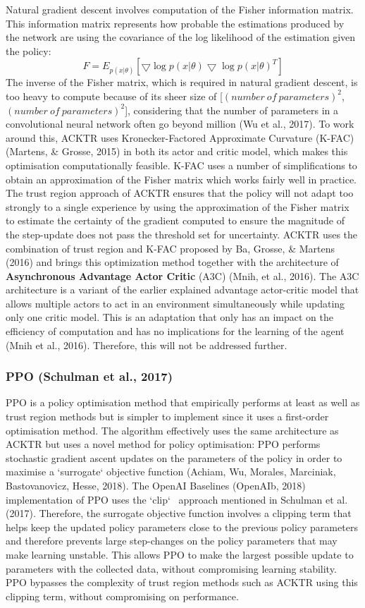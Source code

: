 Natural gradient descent involves computation of the Fisher information matrix. This information matrix represents how probable the estimations produced by the network are using the covariance of the log likelihood of the estimation given the policy: 
\[ F = E_{p(x|\theta)}[\bigtriangledown \log p(x|\theta) \bigtriangledown \log p(x|\theta)^{T}] \]
The inverse of the Fisher matrix, which is required in natural gradient descent, is too heavy to compute because of its sheer size of [$(number \ of \ parameters)^{2}$, $(number \ of \ parameters)^{2}$], considering that the number of parameters in a convolutional neural network often go beyond million (Wu et al., 2017). To work around this, ACKTR uses Kronecker-Factored Approximate Curvature (K-FAC) (Martens, \& Grosse, 2015) in both its actor and critic model, which makes this optimisation computationally feasible. K-FAC uses a number of simplifications to obtain an approximation of the Fisher matrix which works fairly well in practice. The trust region approach of ACKTR ensures that the policy will not adapt too strongly to a single experience by using the approximation of the Fisher matrix to estimate the certainty of the gradient computed to ensure the magnitude of the step-update does not pass the threshold set for uncertainty. ACKTR uses the combination of trust region and K-FAC proposed by Ba, Grosse, \& Martens (2016) and brings this optimization method together with the architecture of \textbf{Asynchronous Advantage Actor Critic} (A3C) (Mnih, et al., 2016). The A3C architecture is a variant of the earlier explained advantage actor-critic model that allows multiple actors to act in an environment simultaneously while updating only one critic model. This is an adaptation that only has an impact on the efficiency of computation and has no implications for the learning of the agent (Mnih et al., 2016). Therefore, this will not be addressed further.

\subsubsection*{PPO (Schulman et al., 2017)}
PPO is a policy optimisation method that empirically performs at least as well as trust region methods but is simpler to implement since it uses a first-order optimisation method. The algorithm effectively uses the same architecture as ACKTR but uses a novel method for policy optimisation: PPO performs stochastic gradient ascent updates on the parameters of the policy in order to maximise a `surrogate` objective function (Achiam, Wu, Morales, Marciniak, Bastovanovicz, Hesse, 2018). The OpenAI Baselines (OpenAIb, 2018) implementation of PPO uses the `clip` \ approach mentioned in Schulman et al. (2017). Therefore, the surrogate objective function involves a clipping term that helps keep the updated policy parameters close to the previous policy parameters and therefore prevents large step-changes on the policy parameters that may make learning unstable. This allows PPO to make the largest possible update to parameters with the collected data, without compromising learning stability. PPO bypasses the complexity of trust region methods such as ACKTR using this clipping term, without compromising on performance.

